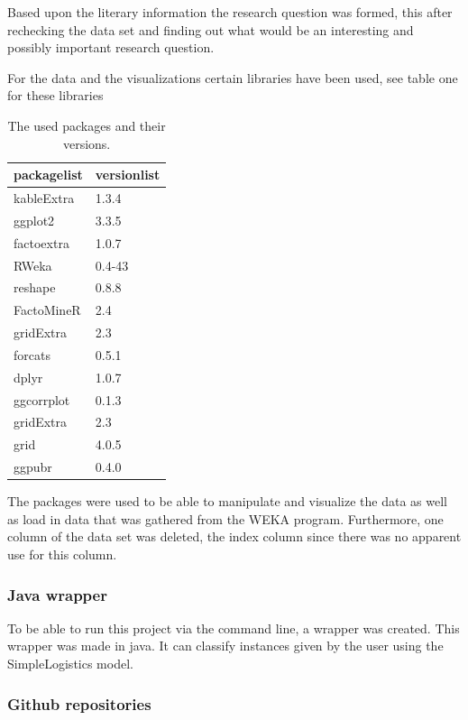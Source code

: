 \documentclass[
]{article}
\begin{document}
Based upon the literary information the research question was formed,
this after rechecking the data set and finding out what would be an
interesting and possibly important research question.

For the data and the visualizations certain libraries have been used,
see table one for these libraries

\begin{table}[!h]

\caption{\label{tab:packages}The used packages and their versions.}
\centering
\begin{tabular}[t]{l|l}
\hline
packagelist & versionlist\\
\hline
kableExtra & 1.3.4\\
\hline
ggplot2 & 3.3.5\\
\hline
factoextra & 1.0.7\\
\hline
RWeka & 0.4-43\\
\hline
reshape & 0.8.8\\
\hline
FactoMineR & 2.4\\
\hline
gridExtra & 2.3\\
\hline
forcats & 0.5.1\\
\hline
dplyr & 1.0.7\\
\hline
ggcorrplot & 0.1.3\\
\hline
gridExtra & 2.3\\
\hline
grid & 4.0.5\\
\hline
ggpubr & 0.4.0\\
\hline
\end{tabular}
\end{table}

The packages were used to be able to manipulate and visualize the data
as well as load in data that was gathered from the WEKA program.
Furthermore, one column of the data set was deleted, the index column
since there was no apparent use for this column.

\hypertarget{java-wrapper}{%
\subsubsection{Java wrapper}\label{java-wrapper}}

To be able to run this project via the command line, a wrapper was
created. This wrapper was made in java. It can classify instances given
by the user using the SimpleLogistics model.

\hypertarget{github-repositories}{%
\subsubsection{Github repositories}\label{github-repositories}}
\end{document}
